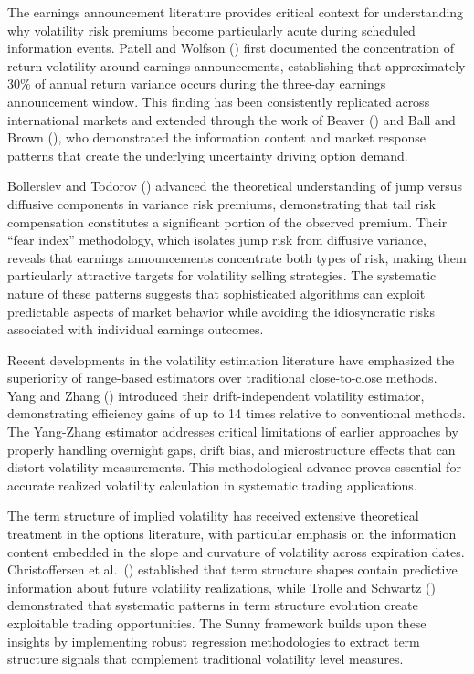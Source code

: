 \documentclass[
  american,
  11pt,
  11pt,
  letterpaper,
  onecolumn]{article}
\begin{document}
The earnings announcement literature provides critical context for
understanding why volatility risk premiums become particularly acute
during scheduled information events. Patell and Wolfson
(\textcite{patell1979}) first documented the concentration of return
volatility around earnings announcements, establishing that
approximately 30\% of annual return variance occurs during the three-day
earnings announcement window. This finding has been consistently
replicated across international markets and extended through the work of
Beaver (\textcite{beaver1968}) and Ball and Brown (\textcite{ball1968}),
who demonstrated the information content and market response patterns
that create the underlying uncertainty driving option demand.

Bollerslev and Todorov (\textcite{bollerslev2011}) advanced the
theoretical understanding of jump versus diffusive components in
variance risk premiums, demonstrating that tail risk compensation
constitutes a significant portion of the observed premium. Their ``fear
index'' methodology, which isolates jump risk from diffusive variance,
reveals that earnings announcements concentrate both types of risk,
making them particularly attractive targets for volatility selling
strategies. The systematic nature of these patterns suggests that
sophisticated algorithms can exploit predictable aspects of market
behavior while avoiding the idiosyncratic risks associated with
individual earnings outcomes.

Recent developments in the volatility estimation literature have
emphasized the superiority of range-based estimators over traditional
close-to-close methods. Yang and Zhang (\textcite{yang2000}) introduced
their drift-independent volatility estimator, demonstrating efficiency
gains of up to 14 times relative to conventional methods. The Yang-Zhang
estimator addresses critical limitations of earlier approaches by
properly handling overnight gaps, drift bias, and microstructure effects
that can distort volatility measurements. This methodological advance
proves essential for accurate realized volatility calculation in
systematic trading applications.

The term structure of implied volatility has received extensive
theoretical treatment in the options literature, with particular
emphasis on the information content embedded in the slope and curvature
of volatility across expiration dates. Christoffersen et
al.~(\textcite{christoffersen2013}) established that term structure
shapes contain predictive information about future volatility
realizations, while Trolle and Schwartz (\textcite{trolle2009})
demonstrated that systematic patterns in term structure evolution create
exploitable trading opportunities. The Sunny framework builds upon these
insights by implementing robust regression methodologies to extract term
structure signals that complement traditional volatility level measures.
\end{document}
